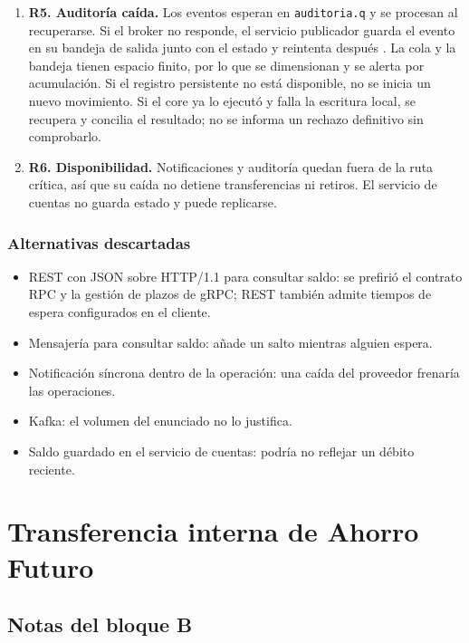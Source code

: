 \documentclass[12pt,a4paper]{article}
\begin{document}
\begin{enumerate}
    \item \textbf{R5. Auditoría caída.}
    Los eventos esperan en \texttt{auditoria.q} y se procesan al recuperarse. Si el broker no responde, el servicio publicador guarda el evento en su bandeja de salida junto con el estado y reintenta después \cite{awsoutbox}. La cola y la bandeja tienen espacio finito, por lo que se dimensionan y se alerta por acumulación. Si el registro persistente no está disponible, no se inicia un nuevo movimiento. Si el core ya lo ejecutó y falla la escritura local, se recupera y concilia el resultado; no se informa un rechazo definitivo sin comprobarlo.

    \item \textbf{R6. Disponibilidad.}
    Notificaciones y auditoría quedan fuera de la ruta crítica, así que su caída no detiene transferencias ni retiros. El servicio de cuentas no guarda estado y puede replicarse.
\end{enumerate}

\subsubsection{Alternativas descartadas}

\begin{itemize}
    \item REST con JSON sobre HTTP/1.1 para consultar saldo: se prefirió el contrato RPC y la gestión de plazos de gRPC; REST también admite tiempos de espera configurados en el cliente.
    \item Mensajería para consultar saldo: añade un salto mientras alguien espera.
    \item Notificación síncrona dentro de la operación: una caída del proveedor frenaría las operaciones.
    \item Kafka: el volumen del enunciado no lo justifica.
    \item Saldo guardado en el servicio de cuentas: podría no reflejar un débito reciente.
\end{itemize}

\section{Transferencia interna de Ahorro Futuro}

\subsection{Notas del bloque B}
\end{document}

